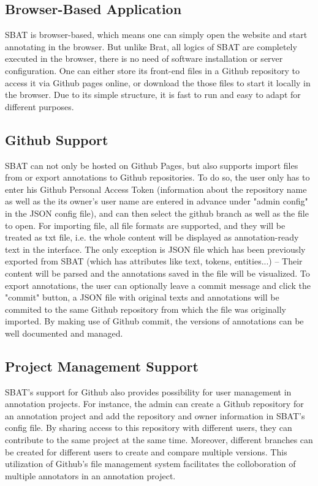 \documentclass[12ptm a4paper]{article}
\begin{document}
\subsection{Browser-Based Application}
SBAT is browser-based, which means one can simply open the website and start annotating in the browser. But unlike Brat, all logics of SBAT are completely executed in the browser, there is no need of software installation or server configuration. One can either store its front-end files in a Github repository to access it via Github pages online, or download the those files to start it locally in the browser. Due to its simple structure, it is fast to run and easy to adapt for different purposes.
\subsection{Github Support}
SBAT can not only be hosted on Github Pages, but also supports import files from or export annotations to Github repositories. To do so, the user only has to enter his Github Personal Access Token (information about the repository name as well as the its owner's user name are entered in advance under "admin config" in the JSON config file), and can then select the github branch as well as the file to open. For importing file, all file formats are supported, and they will be treated as txt file, i.e. the whole content will be displayed as annotation-ready text in the interface. The only exception is JSON file which has been previously exported from SBAT (which has attributes like text, tokens, entities...) -- Their content will be parsed and the annotations saved in the file will be visualized. To export annotations, the user can optionally leave a commit message and click the "commit" button, a JSON file with original texts and annotations will be commited to the same Github repository from which the file was originally imported. By making use of Github commit, the versions of annotations can be well documented and managed.
\subsection{Project Management Support}
SBAT's support for Github also provides possibility for user management in annotation projects. For instance, the admin can create a Github repository for an annotation project and add the repository and owner information in SBAT's config file. By sharing access to this repository with different users, they can contribute to the same project at the same time. Moreover, different branches can be created for different users to create and compare multiple versions. This utilization of Github's file management system facilitates the colloboration of multiple annotators in an annotation project.
\end{document}
